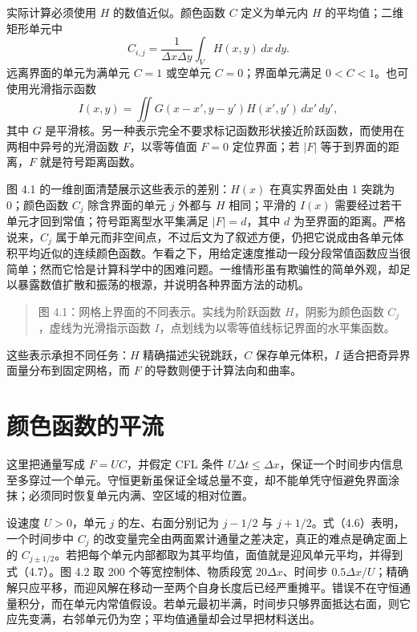 \documentclass[11pt,a4paper,openany,fontset=none]{ctexbook}
\begin{document}
实际计算必须使用 $H$ 的数值近似。颜色函数 $C$ 定义为单元内 $H$ 的平均值；二维矩形单元中
\begin{equation}
C_{i,j}=\frac{1}{\Delta x\Delta y}\int_V H(x,y)\,dx\,dy.
\tag{4.3}
\end{equation}
远离界面的单元为满单元 $C=1$ 或空单元 $C=0$；界面单元满足 $0<C<1$。也可使用光滑指示函数
\begin{equation}
I(x,y)=\iint G(x-x',y-y')H(x',y')\,dx'\,dy',
\tag{4.4}
\end{equation}
其中 $G$ 是平滑核。另一种表示完全不要求标记函数形状接近阶跃函数，而使用在两相中异号的光滑函数 $F$，以零等值面 $F=0$ 定位界面；若 $|F|$ 等于到界面的距离，$F$ 就是符号距离函数。

图 4.1 的一维剖面清楚展示这些表示的差别：$H(x)$ 在真实界面处由 1 突跳为 0；颜色函数 $C_j$ 除含界面的单元 $j$ 外都与 $H$ 相同；平滑的 $I(x)$ 需要经过若干单元才回到常值；符号距离型水平集满足 $|F|=d$，其中 $d$ 为至界面的距离。严格说来，$C_j$ 属于单元而非空间点，不过后文为了叙述方便，仍把它说成由各单元体积平均近似的连续颜色函数。乍看之下，用给定速度推动一段分段常值函数应当很简单；然而它恰是计算科学中的困难问题。一维情形虽有欺骗性的简单外观，却足以暴露数值扩散和振荡的根源，并说明各种界面方法的动机。

\begin{quote}\small 图 4.1：网格上界面的不同表示。实线为阶跃函数 $H$，阴影为颜色函数 $C_j$，虚线为光滑指示函数 $I$，点划线为以零等值线标记界面的水平集函数。\end{quote}
这些表示承担不同任务：$H$ 精确描述尖锐跳跃，$C$ 保存单元体积，$I$ 适合把奇异界面量分布到固定网格，而 $F$ 的导数则便于计算法向和曲率。

\section{颜色函数的平流}

这里把通量写成 $F=UC$，并假定 CFL 条件 $U\Delta t\le\Delta x$，保证一个时间步内信息至多穿过一个单元。守恒更新虽保证全域总量不变，却不能单凭守恒避免界面涂抹；必须同时恢复单元内满、空区域的相对位置。

设速度 $U>0$，单元 $j$ 的左、右面分别记为 $j-1/2$ 与 $j+1/2$。式（4.6）表明，一个时间步中 $C_j$ 的改变量完全由两面累计通量之差决定，真正的难点是确定面上的 $C_{j\pm1/2}$。若把每个单元内部都取为其平均值，面值就是迎风单元平均，并得到式（4.7）。图 4.2 取 200 个等宽控制体、物质段宽 $20\Delta x$、时间步 $0.5\Delta x/U$；精确解只应平移，而迎风解在移动一至两个自身长度后已经严重摊平。错误不在守恒通量积分，而在单元内常值假设。若单元最初半满，时间步只够界面抵达右面，则它应先变满，右邻单元仍为空；平均值通量却会过早把材料送出。
\end{document}
